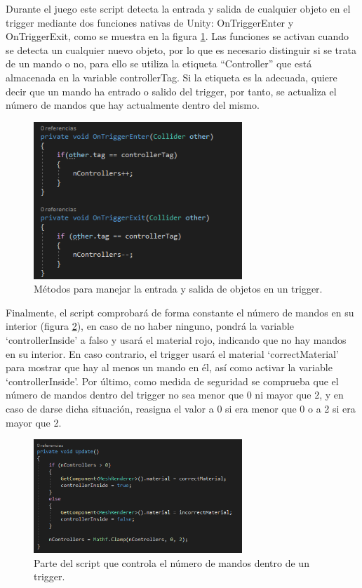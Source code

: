 Durante el juego este script detecta la entrada y salida de cualquier objeto en el trigger mediante dos funciones nativas de Unity: OnTriggerEnter y OnTriggerExit, como se muestra en la figura \ref{fig:E2_onTriggerEnter}. Las funciones se activan cuando se detecta un cualquier nuevo objeto, por lo que es necesario distinguir si se trata de un mando o no, para ello se utiliza la etiqueta “Controller” que está almacenada en la variable controllerTag. Si la etiqueta es la adecuada, quiere decir que un mando ha entrado o salido del trigger, por tanto, se actualiza el número de mandos que hay actualmente dentro del mismo.


\begin{figure}
  \centering
    \includegraphics[width=0.7\textwidth]{04.Desarrollo/02.Entrega2/02.Iteracion2_2/00.Figuras/02.on_trigger_enter.png}
    \caption{Métodos para manejar la entrada y salida de objetos en un trigger.}
    \label{fig:E2_onTriggerEnter}
\end{figure}

Finalmente, el script comprobará de forma constante el número de mandos en su interior (figura \ref{fig:E2_updateTrigger}), en caso de no haber ninguno, pondrá la variable ‘controllerInside’ a falso y usará el material rojo, indicando que no hay mandos en su interior. En caso contrario, el trigger usará el material ‘correctMaterial’ para mostrar que hay al menos un mando en él, así como activar la variable ‘controllerInside’. Por último, como medida de seguridad se comprueba que el número de mandos dentro del trigger no sea menor que 0 ni mayor que 2, y en caso de darse dicha situación, reasigna el valor a 0 si era menor que 0 o a 2 si era mayor que 2.


\begin{figure}
  \centering
    \includegraphics[width=0.7\textwidth]{04.Desarrollo/02.Entrega2/02.Iteracion2_2/00.Figuras/03.update_trigger.png}
    \caption{Parte del script que controla el número de mandos dentro de un trigger.}
    \label{fig:E2_updateTrigger}
\end{figure}

